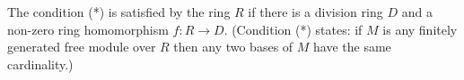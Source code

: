 The condition (*) is satisfied by the ring $R$ if there is a division ring $D$ and a non-zero ring homomorphism $f: R \rightarrow D$. (Condition (*) states: if $M$ is any finitely generated free module over $R$ then any two bases of $M$ have the same cardinality.)
